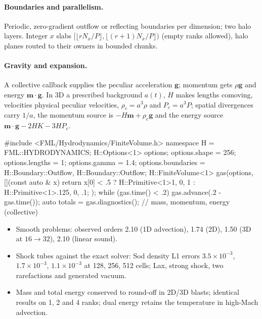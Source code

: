 \paragraph*{Boundaries and parallelism.} Periodic, zero-gradient outflow or reflecting boundaries per dimension; two
halo layers. Integer $x$ slabs $[\lfloor rN_x/P\rfloor,\lfloor(r+1)N_x/P\rfloor)$ (empty ranks allowed), halo planes
routed to their owners in bounded chunks.

\paragraph*{Gravity and expansion.} A collective  callback supplies the peculiar acceleration $\bm g$;
momentum gets $\rho\bm g$ and energy $\bm m\cdot\bm g$. In 3D a prescribed background $a(t)$, $H$ makes lengths
comoving, velocities physical peculiar velocities, $\rho_c=a^3\rho$ and $P_c=a^3P$; spatial divergences carry $1/a$, the
momentum source is $-H\bm m+\rho_c\bm g$ and the energy source $\bm m\cdot\bm g-2HK-3HP_c$.

\begin{cppcode}
#include <FML/Hydrodynamics/FiniteVolume.h>
namespace H = FML::HYDRODYNAMICS;
H::Options<1> options;
options.shape = {256}; options.lengths = {1}; options.gamma = 1.4;
options.boundaries = {{{H::Boundary::Outflow, H::Boundary::Outflow}}};
H::FiniteVolume<1> gas(options, [](const auto & x) {
    return x[0] < .5 ? H::Primitive<1>{1, {0}, 1} : H::Primitive<1>{.125, {0}, .1};
});
while (gas.time() < .2) gas.advance(.2 - gas.time());
auto totals = gas.diagnostics();        // mass, momentum, energy (collective)
\end{cppcode}

\begin{validation}
\begin{itemize}
\item Smooth problems: observed orders 2.10 (1D advection), 1.74 (2D), 1.50 (3D at $16\to32$), 2.10 (linear sound).
\item Shock tubes against the exact solver: Sod density L1 errors $3.5\times10^{-3}$, $1.7\times10^{-3}$,
      $1.1\times10^{-3}$ at 128, 256, 512 cells; Lax, strong shock, two rarefactions and generated vacuum.
\item Mass and total energy conserved to round-off in 2D/3D blasts; identical results on 1, 2 and 4 ranks; dual energy
      retains the temperature in high-Mach advection.
\end{itemize}
\end{validation}

